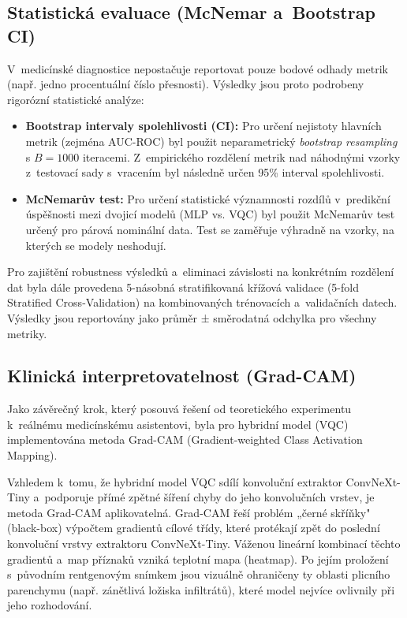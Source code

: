 \documentclass[12pt, a4paper]{report}
\begin{document}
\subsection{Statistická evaluace (McNemar a~Bootstrap CI)}
V~medicínské diagnostice nepostačuje reportovat pouze bodové odhady metrik (např. jedno procentuální číslo přesnosti). Výsledky jsou proto podrobeny rigorózní statistické analýze:
\begin{itemize}
    \item \textbf{Bootstrap intervaly spolehlivosti (CI):} Pro určení nejistoty hlavních metrik (zejména AUC-ROC) byl použit neparametrický \textit{bootstrap resampling} s $B = 1000$ iteracemi. Z~empirického rozdělení metrik nad náhodnými vzorky z~testovací sady s~vracením byl následně určen 95\% interval spolehlivosti.
    \item \textbf{McNemarův test:} Pro určení statistické významnosti rozdílů v~predikční úspěšnosti mezi dvojicí modelů (MLP vs. VQC) byl použit McNemarův test určený pro párová nominální data. Test se zaměřuje výhradně na vzorky, na kterých se modely neshodují.
\end{itemize}

Pro zajištění robustness výsledků a~eliminaci závislosti na konkrétním rozdělení dat byla dále provedena 5-násobná stratifikovaná křížová validace (5-fold Stratified Cross-Validation) na kombinovaných trénovacích a~validačních datech. Výsledky jsou reportovány jako průměr ± směrodatná odchylka pro všechny metriky.

\subsection{Klinická interpretovatelnost (Grad-CAM)}
Jako závěrečný krok, který posouvá řešení od teoretického experimentu k~reálnému medicínskému asistentovi, byla pro hybridní model (VQC) implementována metoda Grad-CAM (Gradient-weighted Class Activation Mapping).

Vzhledem k~tomu, že hybridní model VQC sdílí konvoluční extraktor ConvNeXt-Tiny a~podporuje přímé zpětné šíření chyby do jeho konvolučních vrstev, je metoda Grad-CAM aplikovatelná. Grad-CAM řeší problém „černé skříňky" (black-box) výpočtem gradientů cílové třídy, které protékají zpět do poslední konvoluční vrstvy extraktoru ConvNeXt-Tiny. Váženou lineární kombinací těchto gradientů a~map příznaků vzniká teplotní mapa (heatmap). Po jejím proložení s~původním rentgenovým snímkem jsou vizuálně ohraničeny ty oblasti plicního parenchymu (např. zánětlivá ložiska infiltrátů), které model nejvíce ovlivnily při jeho rozhodování.
\end{document}
